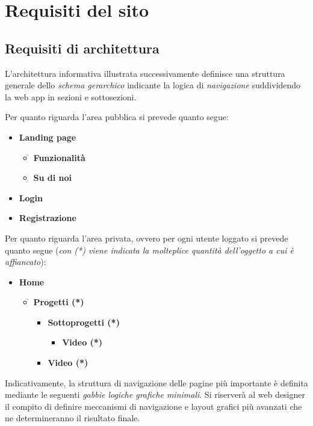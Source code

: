 
\chapter{Requisiti del sito}\label{chap:requisiti-del-sito}

\section{Requisiti di architettura}\label{sec:requisiti-di-architettura}

L'architettura informativa illustrata successivamente definisce una struttura 
generale dello \textit{schema gerarchico} indicante la logica di 
\textit{navigazione} suddividendo la web app in sezioni e sottosezioni. 

Per quanto riguarda l'area pubblica si prevede quanto segue:
\begin{itemize}
	\item \textbf{Landing page}
	\begin{itemize}
		\item \textbf{Funzionalità}
		\item \textbf{Su di noi}
	\end{itemize}
\item \textbf{Login}
\item \textbf{Registrazione}
\end{itemize}
Per quanto riguarda l'area privata, ovvero per ogni utente loggato si prevede 
quanto segue (\textit{con (*) viene indicata la molteplice quantità 
dell'oggetto a cui è affiancato}): 
\begin{itemize}
	\item \textbf{Home}
	\begin{itemize}
		\item \textbf{Progetti (*)} 
		\begin{itemize}
			\item \textbf{Sottoprogetti (*)}
			\begin{itemize}
				\item \textbf{Video (*)}
			\end{itemize}
		\item \textbf{Video (*)}
		\end{itemize}
	\end{itemize}
\end{itemize}
Indicativamente, la struttura di navigazione delle pagine più importante è 
definita mediante le seguenti \textit{gabbie logiche grafiche minimali}. Si 
riserverà al web designer il compito di definire meccanismi di navigazione e 
layout grafici più avanzati che ne determineranno il risultato finale.

